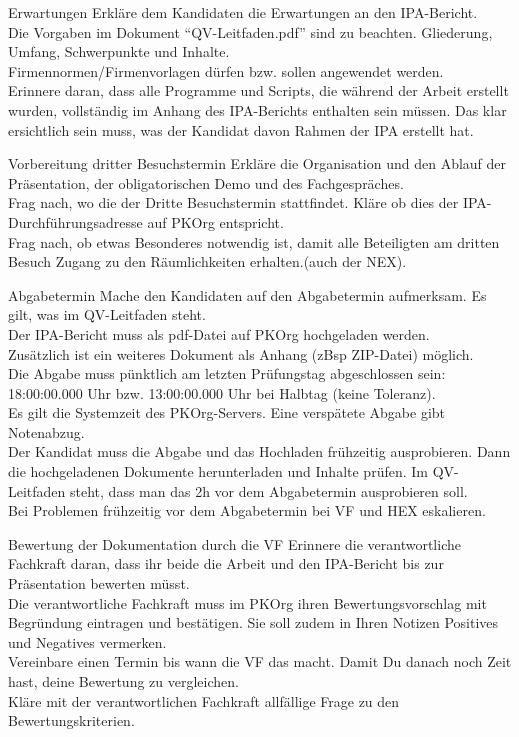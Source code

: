 \begin{taskitem}{Erwartungen}
  Erkläre dem Kandidaten die Erwartungen an den IPA-Bericht.\\Die Vorgaben im Dokument \enquote{QV-Leitfaden.pdf} sind zu beachten. Gliederung, Umfang, Schwerpunkte und Inhalte.\\Firmennormen/Firmenvorlagen dürfen bzw. sollen angewendet werden.\\Erinnere daran, dass alle Programme und Scripts, die während der Arbeit erstellt wurden, vollständig im Anhang des IPA-Berichts enthalten sein müssen. Das klar ersichtlich sein muss, was der Kandidat davon Rahmen der IPA erstellt hat.
\end{taskitem}
\newpage
\begin{taskitem}{Vorbereitung dritter Besuchstermin}
  Erkläre die Organisation und den Ablauf der Präsentation, der obligatorischen Demo und des Fachgespräches.\\Frag nach, wo die der Dritte Besuchstermin stattfindet. Kläre ob dies der IPA-Durchführungsadresse auf PKOrg entspricht.\\Frag nach, ob etwas Besonderes notwendig ist, damit alle Beteiligten am dritten Besuch Zugang zu den Räumlichkeiten erhalten.(auch der NEX).
\end{taskitem}
\begin{taskitem}{Abgabetermin}
  Mache den Kandidaten auf den Abgabetermin aufmerksam. Es gilt, was im QV-Leitfaden steht.\\ Der IPA-Bericht muss als pdf-Datei auf PKOrg hochgeladen werden.\\Zusätzlich ist ein weiteres Dokument als Anhang (zBsp ZIP-Datei) möglich.\\Die Abgabe muss pünktlich am letzten Prüfungstag abgeschlossen sein: 18:00:00.000 Uhr bzw. 13:00:00.000 Uhr bei Halbtag (keine Toleranz).\\ Es gilt die Systemzeit des PKOrg-Servers. Eine verspätete Abgabe gibt Notenabzug.\\Der Kandidat muss die Abgabe und das Hochladen frühzeitig ausprobieren. Dann die hochgeladenen Dokumente herunterladen und Inhalte prüfen. Im QV-Leitfaden steht, dass man das 2h vor dem Abgabetermin ausprobieren soll.\\Bei Problemen frühzeitig vor dem Abgabetermin bei VF und HEX eskalieren. 
\end{taskitem}
\newpage
\begin{taskitem}{Bewertung der Dokumentation durch die VF}
  Erinnere die verantwortliche Fachkraft daran, dass ihr beide die Arbeit und den IPA-Bericht bis zur Präsentation bewerten müsst.\\Die verantwortliche Fachkraft muss im PKOrg ihren Bewertungsvorschlag mit Begründung eintragen und bestätigen. Sie soll zudem in Ihren Notizen Positives und Negatives vermerken.\\Vereinbare einen Termin bis wann die VF das macht. Damit Du danach noch Zeit hast, deine Bewertung zu vergleichen.\\Kläre mit der verantwortlichen Fachkraft allfällige Frage zu den Bewertungskriterien. 
\end{taskitem}
